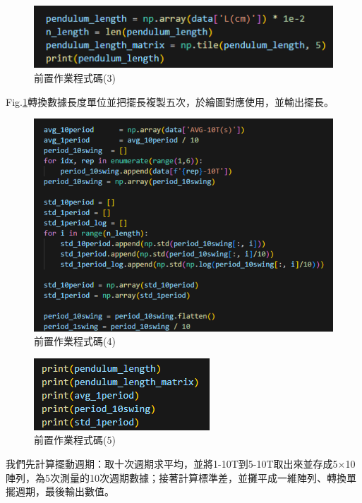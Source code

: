 \documentclass[12pt,a4paper]{article}
\begin{document}
\begin{CJK}{UTF8}{bkai}
\begin{figure}[h]
    \centering
    \includegraphics[width=1\linewidth]{FD3.png}
    \caption{前置作業程式碼(3)}
    \label{fig:FD3}
\end{figure}
\indent Fig.\ref{fig:FD3}轉換數據長度單位並把擺長複製五次，於繪圖對應使用，並輸出擺長。

\clearpage

\begin{figure}[h]
    \centering
    \includegraphics[width=1\linewidth]{FD4.png}
    \caption{前置作業程式碼(4)}
    \label{fig:FD4}
\end{figure}
\begin{figure}[h]
    \centering
    \includegraphics[width=0.5\linewidth]{FD5.png}
    \caption{前置作業程式碼(5)}
    \label{fig:FD5}
\end{figure}
\indent 我們先計算擺動週期：取十次週期求平均，並將1-10T到5-10T取出來並存成5$\times$10陣列，為5次測量的10次週期數據；接著計算標準差，並攤平成一維陣列、轉換單擺週期，最後輸出數值。


\end{CJK}
\end{document}
